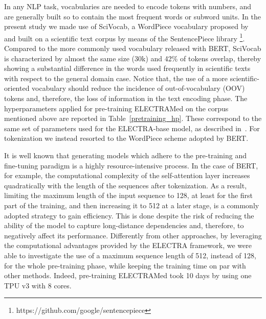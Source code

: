 \documentclass{article}
\begin{document}
In any NLP task, vocabularies are needed to encode tokens with numbers, and are generally built so to contain the most frequent words or subword units.
In the present study we made use of SciVocab, a WordPiece vocabulary proposed by \citep{Beltagy19} and built on a scientific text corpus by means of the SentencePiece library \footnote{https://github.com/google/sentencepiece}. 
Compared to the more commonly used vocabulary released with BERT, SciVocab is characterized by almost the same size (30k) and 42\% of tokens overlap, thereby showing a substantial difference in the words used frequently in scientific texts with respect to the general domain case.
Notice that, the use of a more scientific-oriented vocabulary should reduce the incidence of out-of-vocabulary (OOV) tokens and, therefore, the loss of information in the text encoding phase.
The hyperparameters applied for pre-training ELECTRAMed on the corpus mentioned above are reported in Table~\ref{pretraining_hp}.
These correspond to the same set of parameters used for the ELECTRA-base model, as described in~\citep{Clark20}.
For tokenization we instead resorted to the WordPiece scheme adopted by BERT.

It is well known that generating models which adhere to the pre-training and fine-tuning paradigm is a highly resource-intensive process. 
In the case of BERT, for example, the computational complexity of the self-attention layer increases quadratically with the length of the sequences after tokenization.
As a result, limiting the maximum length of the input sequence to 128, at least for the first part of the training, and then increasing it to 512 at a later stage, is a commonly adopted strategy to gain efficiency.
This is done despite the risk of reducing the ability of the model to capture long-distance dependencies and, therefore, to negatively affect its performance.
Differently from other approaches, by leveraging the computational advantages provided by the ELECTRA framework, we were able to investigate the use of a maximum sequence length of 512, instead of 128, for the whole pre-training phase, while keeping the training time on par with other methods.
Indeed, pre-training ELECTRAMed took 10 days by using one TPU v3 with 8 cores.
\end{document}
